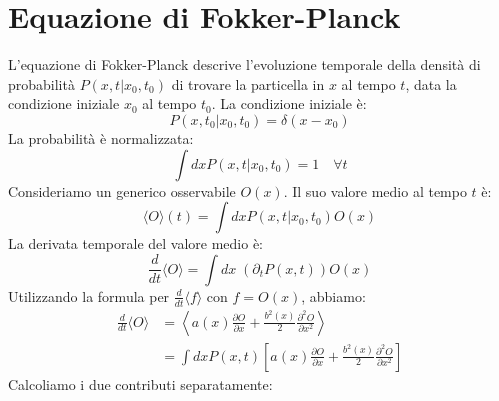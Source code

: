 \section{Equazione di Fokker-Planck}
L'equazione di Fokker-Planck descrive l'evoluzione temporale della densità di probabilità $P(x,t|x_0,t_0)$ di trovare la particella in $x$ al tempo $t$, data la condizione iniziale $x_0$ al tempo $t_0$.
La condizione iniziale è:
\begin{equation}
P(x,t_0|x_0,t_0) = \delta(x-x_0)
\end{equation}
La probabilità è normalizzata:
\begin{equation}
\int dx P(x,t|x_0,t_0) = 1 \quad \forall t
\end{equation}
Consideriamo un generico osservabile $O(x)$. Il suo valore medio al tempo $t$ è:
\begin{equation}
\langle O \rangle (t) = \int dx P(x,t|x_0,t_0) O(x)
\end{equation}
La derivata temporale del valore medio è:
\begin{equation}
\frac{d}{dt}\langle O \rangle = \int dx \; ( \partial_t P(x,t)) O(x)
\end{equation}
Utilizzando la formula per $\frac{d}{dt}\langle f \rangle$ con $f=O(x)$, abbiamo:
\begin{equation} 
\begin{aligned}
\frac{d}{dt}\langle O \rangle &= \left\langle a(x)\frac{\partial O}{\partial x} + \frac{b^2(x)}{2}\frac{\partial^2 O}{\partial x^2} \right\rangle \\ &= \int dx P(x,t) \left[ a(x)\frac{\partial O}{\partial x} + \frac{b^2(x)}{2}\frac{\partial^2 O}{\partial x^2} \right] \end{aligned}
\end{equation}
Calcoliamo i due contributi separatamente:
